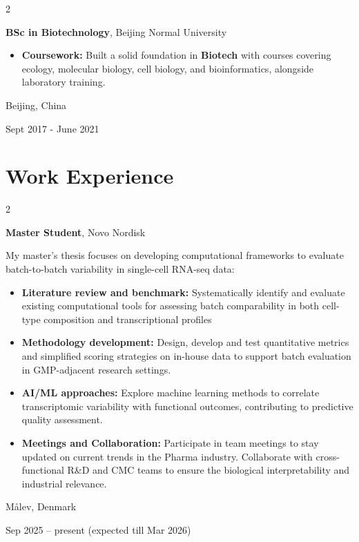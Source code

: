 \documentclass[10pt, letterpaper]{article}
\newenvironment{highlights}{
    \begin{itemize}[
        topsep=0.10 cm,
        parsep=0.10 cm,
        partopsep=0pt,
        itemsep=0pt,
        leftmargin=0.4 cm + 10pt
    ]
}{
    \end{itemize}
} %
\newenvironment{twocolentry}[2][]{
    \onecolentry
    \def\secondColumn{#2}
    \setcolumnwidth{\fill, 4.5 cm}
    \begin{paracol}{2}
}{
    \switchcolumn \raggedleft \secondColumn
    \end{paracol}
    \endonecolentry
} %
\begin{document}
        \vspace{0.3 cm}

\begin{twocolentry}{
    Beijing, China
    
    Sept 2017 - June 2021
}
    \textbf{BSc in Biotechnology}, Beijing Normal University
    \begin{highlights}
        \item \textbf{Coursework:} Built a solid foundation in \textbf{Biotech} with courses covering ecology, molecular biology, cell biology, and bioinformatics, alongside laboratory training.
    \end{highlights}
\end{twocolentry}


    
    \section{Work Experience}

        \begin{twocolentry}{
    Målev, Denmark

    Sep 2025 – present (expected till Mar 2026)
}
    \textbf{Master Student}, Novo Nordisk

    \vspace{0.1cm}
    
     My master’s thesis focuses on developing computational frameworks to evaluate batch-to-batch variability in single-cell RNA-seq data:

    \begin{highlights}
        \item \textbf{Literature review and benchmark:} Systematically identify and evaluate existing computational tools for assessing batch comparability in both cell-type composition and transcriptional profiles

        \vspace{0.1cm}

        \item \textbf{Methodology development:} Design, develop and test quantitative metrics and simplified scoring strategies on in-house data to support batch evaluation in GMP-adjacent research settings.

        \vspace{0.1cm}

        \item \textbf{AI/ML approaches:} Explore machine learning methods to correlate transcriptomic variability with functional outcomes, contributing to predictive quality assessment.

        \vspace{0.1cm}

        \item \textbf{Meetings and Collaboration:} Participate in team meetings to stay updated on current trends in the Pharma industry. Collaborate with cross-functional R\&D and CMC teams to ensure the biological interpretability and industrial relevance.
    \end{highlights}
\end{twocolentry}
\end{document}
